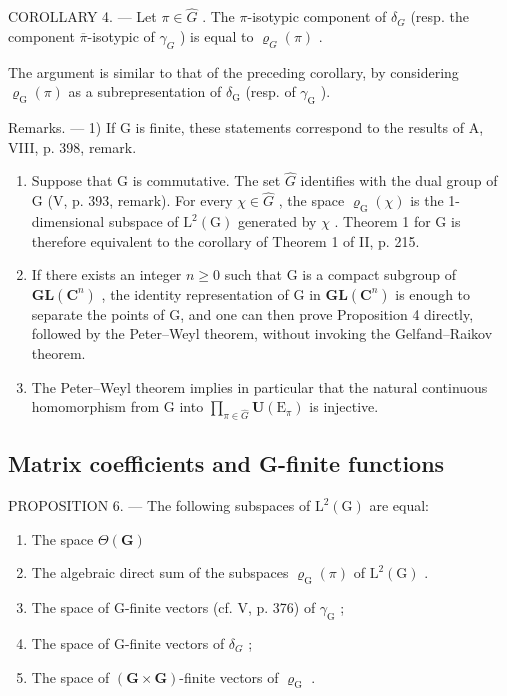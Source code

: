 COROLLARY 4. --- Let \(\pi\in\widehat{G}\) . The \(\pi\)-isotypic component of \(\delta_{G}\) (resp. the component \(\overline{\pi}\)-isotypic of \(\gamma_{G}\) ) is equal to \(\varrho_{G}(\pi)\) .

The argument is similar to that of the preceding corollary, by considering \(\varrho_{\mathrm{G}}(\pi)\) as a subrepresentation of \(\delta_{\mathrm{G}}\) (resp. of \(\gamma_{\mathrm{G}}\) ).

Remarks. --- 1) If G is finite, these statements correspond to the results of A, VIII, p. 398, remark.

\begin{enumerate}
\def\labelenumi{\arabic{enumi})}
\setcounter{enumi}{1}
\item
  Suppose that G is commutative. The set \(\widehat{G}\) identifies with the dual group of G (V, p. 393, remark). For every \(\chi \in \widehat{G}\) , the space \(\varrho_{\mathrm{G}}(\chi)\) is the 1-dimensional subspace of \(\mathrm{L}^2 (\mathrm{G})\) generated by \(\chi\) . Theorem 1 for G is therefore equivalent to the corollary of Theorem 1 of II, p. 215.
\item
  If there exists an integer \(n \geqslant 0\) such that G is a compact subgroup of \(\mathbf{GL}(\mathbf{C}^{n})\) , the identity representation of G in \(\mathbf{GL}(\mathbf{C}^{n})\) is enough to separate the points of G, and one can then prove Proposition 4 directly, followed by the Peter–Weyl theorem, without invoking the Gelfand–Raikov theorem.
\item
  The Peter–Weyl theorem implies in particular that the natural continuous homomorphism from G into \(\prod_{\pi\in\widehat{G}}\mathbf{U}(\mathrm{E}_{\pi})\) is injective.
\end{enumerate}

\subsection{Matrix coefficients and G-finite functions}

PROPOSITION 6. --- The following subspaces of \(\mathrm{L}^{2}(\mathrm{G})\) are equal:

\begin{enumerate}
\def\labelenumi{\alph{enumi})}
\item
  The space \(\Theta (\mathbf{G})\)
\item
  The algebraic direct sum of the subspaces \(\varrho_{\mathrm{G}}(\pi)\) of \(\mathrm{L}^2 (\mathrm{G})\) .
\item
  The space of G-finite vectors (cf. V, p. 376) of \(\gamma_{\mathrm{G}}\) ;
\item
  The space of G-finite vectors of \(\delta_{G}\) ;
\item
  The space of \((\mathbf{G} \times \mathbf{G})\)-finite vectors of \(\varrho_{\mathrm{G}}\) .
\end{enumerate}

